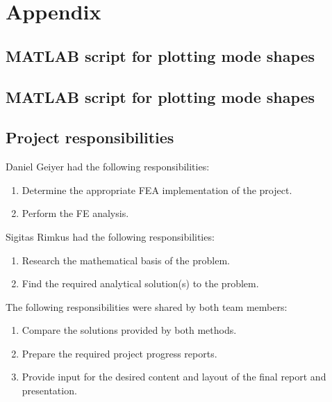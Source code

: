 \documentclass[12pt]{article}
\begin{document}

\newpage
\section{Appendix}
\subsection{MATLAB script for plotting mode shapes}
\lstset{numbers=left, numberstyle=\tiny}


\subsection{MATLAB script for plotting mode shapes}


\subsection{Project responsibilities}
Daniel Geiyer had the following responsibilities:
\begin{enumerate}
	\item{Determine the appropriate FEA implementation of the project.}
	\item{Perform the FE analysis.}
\end{enumerate}
Sigitas Rimkus had the following responsibilities:
\begin{enumerate}
	\item{Research the mathematical basis of the problem.}
	\item{Find the required analytical solution(s) to the problem.}
	\end{enumerate}
The following responsibilities were shared by both team members:
\begin{enumerate}
	\item{Compare the solutions provided by both methods.}
	\item{Prepare the required project progress reports.}
	\item{Provide input for the desired content and layout of the final report and presentation.}
\end{enumerate}
\end{document}
